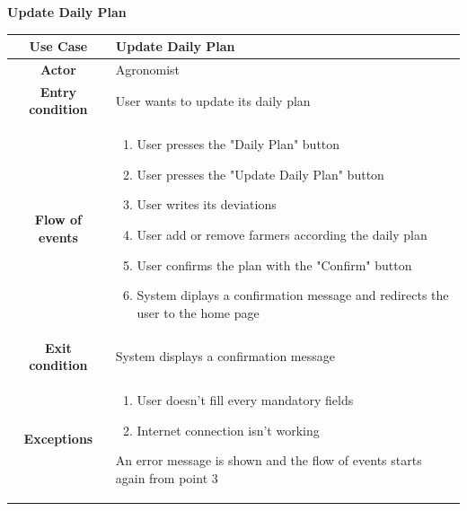 \documentclass[table, 12pt]{article}
\begin{document}
\begin{itemize}
            \begin{table}[H]
                \item[] \textbf{Update Daily Plan}
                \item[] 
                \centering
                \begin{tabular}{|c| m{}|}
                    \hline
                    \textbf{Use Case} & Update Daily Plan\\ \hline
                    \textbf{Actor} & Agronomist\\ \hline
                    \textbf{Entry condition} & User wants to update its daily plan\\  \hline
                    \textbf{Flow of events} & \begin{enumerate}
                                                \item User presses the "Daily Plan" button
                                                \item User presses the "Update Daily Plan" button
                                                \item User writes its deviations
                                                \item User add or remove farmers according the daily plan
                                                \item User confirms the plan with the "Confirm" button
                                                \item System diplays a confirmation message and redirects the user to the home page
                                            \end{enumerate}\\ \hline
                    \textbf{Exit condition} & System displays a confirmation message\\ \hline
                    \textbf{Exceptions} &  \begin{enumerate}
                        \item User doesn't fill every mandatory fields
                        \item Internet connection isn't working
                    \end{enumerate}
                    An error message is shown and the flow of events starts again from point 3\\ \hline                    
                    
                \end{tabular}
            \end{table}


\end{itemize}
\end{document}
